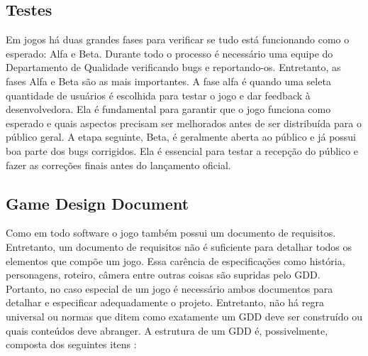 \documentclass[12pt, 
openright, 
oneside, 
a4paper,    
brazil]{facom-ufu-abntex2}
\begin{document}
\subsection{Testes}
Em jogos há duas grandes fases para verificar se tudo está funcionando como o esperado: Alfa e Beta. Durante todo o processo é necessário uma equipe do Departamento de Qualidade verificando bugs e reportando-os. Entretanto, as fases Alfa e Beta são as mais importantes. A fase alfa é quando uma seleta quantidade de usuários é escolhida para testar o jogo e dar feedback à desenvolvedora. Ela é fundamental para garantir que o jogo funciona como esperado e quais aspectos precisam ser melhorados antes de ser distribuída para o público geral. A etapa seguinte, Beta, é geralmente aberta ao público e já possui boa parte dos bugs corrigidos. Ela é essencial para testar a recepção do público e fazer as correções finais antes do lançamento oficial.

\subsection{Game Design Document}
Como em todo software o jogo também possui um documento de requisitos. Entretanto, um documento de requisitos não é suficiente para detalhar todos os elementos que compõe um jogo.  Essa carência de especificações como história, personagens, roteiro, câmera entre outras coisas são supridas pelo GDD.  Portanto, no caso especial de um jogo é necessário ambos documentos para detalhar e especificar adequadamente o projeto. Entretanto, não há regra universal ou normas que ditem como exatamente um GDD deve ser construído ou quais conteúdos deve abranger. A estrutura de um GDD é, possivelmente, composta dos seguintes itens \cite{LevelUp}:
\end{document}
